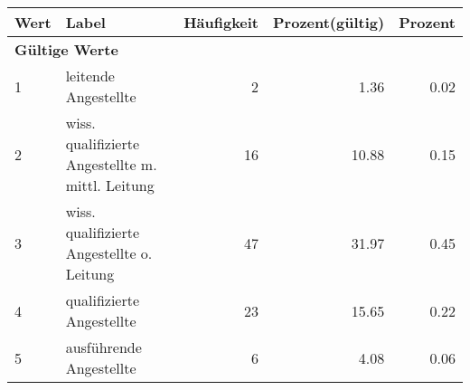      \begin{longtable}{lXrrr}
     \toprule
     \textbf{Wert} & \textbf{Label} & \textbf{Häufigkeit} & \textbf{Prozent(gültig)} & \textbf{Prozent} \\
     \endhead
     \midrule
     \multicolumn{5}{l}{\textbf{Gültige Werte}}\\

     1 &
     \multicolumn{1}{X}{ leitende Angestellte   } &


       \num{2} &
       \num[round-mode=places,round-precision=2]{1.36} &
         \num[round-mode=places,round-precision=2]{0.02} \\

     2 &
     \multicolumn{1}{X}{ wiss. qualifizierte Angestellte m. mittl. Leitung   } &


       \num{16} &
       \num[round-mode=places,round-precision=2]{10.88} &
         \num[round-mode=places,round-precision=2]{0.15} \\

     3 &
     \multicolumn{1}{X}{ wiss. qualifizierte Angestellte o. Leitung   } &


       \num{47} &
       \num[round-mode=places,round-precision=2]{31.97} &
         \num[round-mode=places,round-precision=2]{0.45} \\

     4 &
     \multicolumn{1}{X}{ qualifizierte Angestellte   } &


       \num{23} &
       \num[round-mode=places,round-precision=2]{15.65} &
         \num[round-mode=places,round-precision=2]{0.22} \\

     5 &
     \multicolumn{1}{X}{ ausführende Angestellte   } &


       \num{6} &
       \num[round-mode=places,round-precision=2]{4.08} &
         \num[round-mode=places,round-precision=2]{0.06} \\


\end{longtable}
